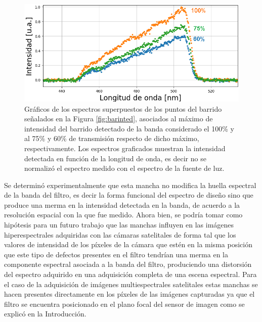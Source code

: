  \begin{figure}[H]
	\centering
	\includegraphics[width=1.0\textwidth]{Figs/microespectrometro/variacionintensidaddefecto.png}
	\caption{Gráficos de los espectros superpuestos de los puntos del barrido señalados en la Figura \ref{fig:barinted}, asociados al máximo de intensidad del barrido detectado de la banda considerado el 100\% y al 75\% y 60\% de transmisión respecto de dicho máximo, respectivamente. Los espectros graficados muestran la intensidad detectada en función de la longitud de onda, es decir no se normalizó el espectro medido con el espectro de la fuente de luz.}
	\label{fig:merrmmin}
\end{figure}

Se determinó experimentalmente que esta mancha no modifica la huella espectral de la banda del filtro, es decir la forma funcional del espectro de diseño sino que produce una merma en la intensidad detectada en la banda, de acuerdo a la resolución espacial con la que fue medido. Ahora bien, se podría tomar como hipótesis para un futuro trabajo que las manchas influyen en las imágenes hiperespectrales adquiridas con las cámaras satelitales de forma tal que los valores de intensidad de los píxeles de la cámara que estén en la misma posición que este tipo de defectos presentes en el filtro tendrían una merma en la componente espectral asociada a la banda del filtro, produciendo una distorsión del espectro adquirido en una adquisición completa de una escena espectral. Para el caso de la adquisición de imágenes multiespectrales satelitales estas manchas se hacen presentes directamente en los píxeles de las imágenes capturadas ya que el filtro se encuentra posicionado en el plano focal del sensor de imagen como se explicó en la Introducción.



